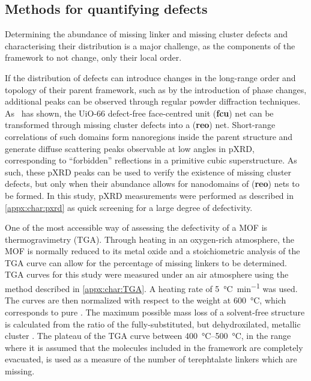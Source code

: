 \subsection{Methods for quantifying defects}

Determining the abundance of missing linker and missing cluster 
defects and characterising their distribution is a major challenge,
as the components of the framework to not change, only their local
order.

If the distribution of defects can introduce changes in the
long-range order and topology of their parent framework,
such as by the introduction of phase changes,
additional peaks can be observed through regular
powder diffraction techniques.
As~\citet{cliffeCorrelatedDefectNanoregions2014} has shown,
the UiO-66 defect-free face-centred unit (\textbf{fcu})
net can be transformed through missing cluster defects into
a (\textbf{reo}) net. Short-range correlations of such domains
form nanoregions inside the parent structure and generate
diffuse scattering peaks observable at low angles in
\gls{pXRD}, corresponding to ``forbidden''
reflections in a primitive cubic superstructure.
As such, these \gls{pXRD} peaks can be used to verify the existence of
missing cluster defects, but only when their abundance allows for
nanodomains of (\textbf{reo}) nets to be formed. In this study,
\gls{pXRD} measurements were performed as described in \autoref{appx:char:pxrd}
as quick screening for a large degree of defectivity.

One of the most accessible way of assessing the defectivity of
a \gls{MOF} is thermogravimetry (\gls{TGA}). Through heating in
an oxygen-rich atmosphere, the \gls{MOF} is normally reduced to
its metal oxide and a stoichiometric analysis of the \gls{TGA} curve
can allow for the percentage of missing linkers to be
determined. \gls{TGA} curves for this study were measured under
an air atmosphere using the method described in \autoref{appx:char:TGA}.
A heating rate of \SI{5}{\degreeCelsius\per\minute} was used.
The curves are then normalized with respect to the weight at
\SI{600}{\degreeCelsius}, which corresponds to pure
. The maximum possible mass loss of a solvent-free
structure is calculated from the ratio of the fully-substituted,
but dehydroxilated, metallic cluster . The plateau
of the \gls{TGA} curve between \SIrange{400}{500}{\degreeCelsius},
in the range where it is assumed that the molecules included in
the framework are completely evacuated, is used as a measure of the
number of terephtalate linkers which are missing.

